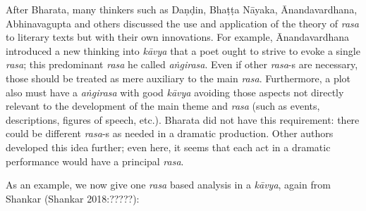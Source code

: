 After Bharata, many thinkers such as Daṇḍin, Bhaṭṭa Nāyaka, Ānandavardhana, Abhinavagupta and others discussed the use and application of the theory of \textsl{rasa} to literary texts but with their own innovations. For example, Ānandavardhana introduced a new thinking into \textsl{kāvya}
 that a poet ought to strive to evoke a single \textsl{rasa}; this predominant \textsl{rasa} he called \textsl{aṅgirasa}. Even if other \textsl{rasa}-s are necessary, those should be treated as mere auxiliary to the main \textsl{rasa}. Furthermore, a plot also must have a \textsl{aṅgirasa} with good \textsl{kāvya} avoiding those aspects not directly relevant to the development of the main theme and \textsl{rasa} (such as events, descriptions, figures of speech, etc.). Bharata did not have this requirement: there could be different \textsl{rasa}-s as needed in a dramatic production. Other authors developed this idea further; even here, it seems that each act in a dramatic performance would have a principal \textsl{rasa}. 

As an example, we now give one \textsl{rasa} based analysis in a \textsl{kāvya}, again from Shankar (Shankar 2018:?????):

